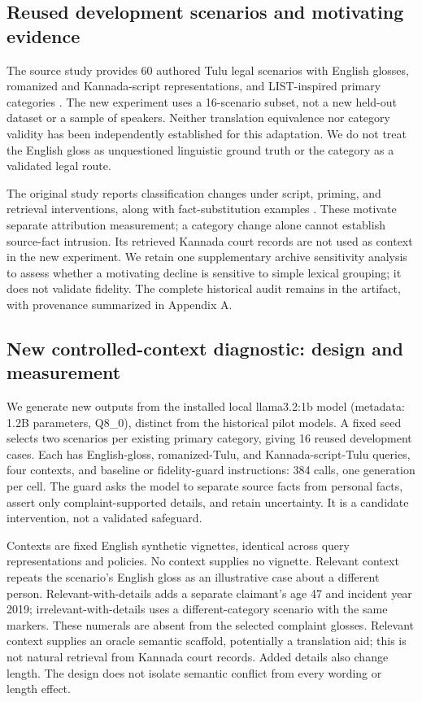 \documentclass[manuscript,screen,review,anonymous]{acmart}
\begin{document}
\subsection{Reused development scenarios and motivating evidence}

The source study provides 60 authored Tulu legal scenarios with English glosses, romanized and Kannada-script representations, and LIST-inspired primary categories \cite{prior}. The new experiment uses a 16-scenario subset, not a new held-out dataset or a sample of speakers. Neither translation equivalence nor category validity has been independently established for this adaptation. We do not treat the English gloss as unquestioned linguistic ground truth or the category as a validated legal route.

The original study reports classification changes under script, priming, and retrieval interventions, along with fact-substitution examples \cite{prior}. These motivate separate attribution measurement; a category change alone cannot establish source-fact intrusion. Its retrieved Kannada court records are not used as context in the new experiment. We retain one supplementary archive sensitivity analysis to assess whether a motivating decline is sensitive to simple lexical grouping; it does not validate fidelity. The complete historical audit remains in the artifact, with provenance summarized in Appendix A.

\subsection{New controlled-context diagnostic: design and measurement}

We generate new outputs from the installed local llama3.2:1b model (metadata: 1.2B parameters, Q8\_0), distinct from the historical pilot models. A fixed seed selects two scenarios per existing primary category, giving 16 reused development cases. Each has English-gloss, romanized-Tulu, and Kannada-script-Tulu queries, four contexts, and baseline or fidelity-guard instructions: 384 calls, one generation per cell. The guard asks the model to separate source facts from personal facts, assert only complaint-supported details, and retain uncertainty. It is a candidate intervention, not a validated safeguard.

Contexts are fixed English synthetic vignettes, identical across query representations and policies. No context supplies no vignette. Relevant context repeats the scenario's English gloss as an illustrative case about a different person. Relevant-with-details adds a separate claimant's age 47 and incident year 2019; irrelevant-with-details uses a different-category scenario with the same markers. These numerals are absent from the selected complaint glosses. Relevant context supplies an oracle semantic scaffold, potentially a translation aid; this is not natural retrieval from Kannada court records. Added details also change length. The design does not isolate semantic conflict from every wording or length effect.
\end{document}
